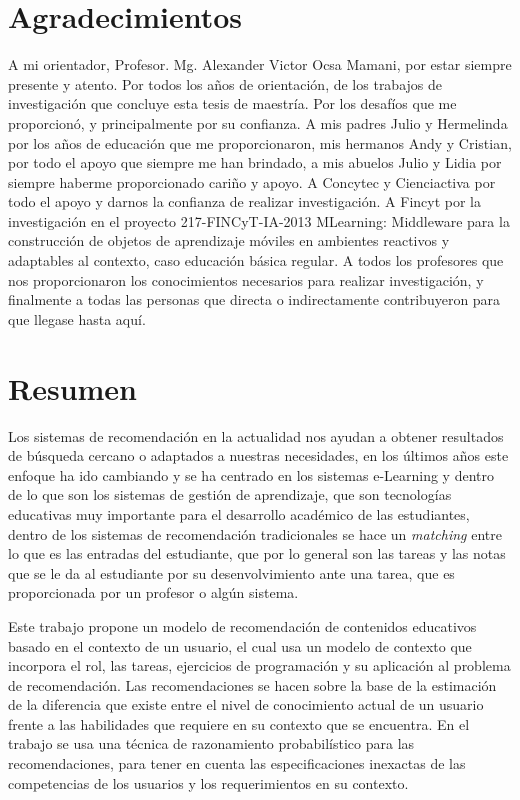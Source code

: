 \chapter*{Agradecimientos}

A mi orientador, Profesor. Mg. Alexander Victor Ocsa Mamani, por estar siempre presente y atento. Por todos los años de orientación, de los trabajos de investigación que concluye esta tesis de maestría. Por los desafíos que me proporcionó, y principalmente por su confianza. A mis padres Julio y Hermelinda por los años de educación que me proporcionaron, mis hermanos Andy y Cristian, por todo el apoyo que siempre me han brindado, a mis abuelos Julio y Lidia por siempre haberme proporcionado cariño y apoyo. A Concytec y Cienciactiva por todo el apoyo y darnos la confianza de realizar investigación. A Fincyt por la investigación en el proyecto 217-FINCyT-IA-2013 MLearning: Middleware para la construcción de objetos de aprendizaje móviles en ambientes reactivos y adaptables al contexto, caso educación básica regular. A todos los profesores que nos proporcionaron los conocimientos necesarios para realizar investigación, y finalmente a todas las personas que directa o indirectamente contribuyeron para que llegase hasta aquí.





\chapter*{Resumen}


Los sistemas de recomendación en la actualidad nos ayudan a obtener resultados  de búsqueda cercano o adaptados a nuestras necesidades, en los últimos años este enfoque ha ido cambiando y se ha centrado en los sistemas e-Learning y dentro de lo que son los sistemas de gestión de aprendizaje, que son tecnologías educativas muy importante para el desarrollo académico de las estudiantes, dentro de los sistemas de recomendación tradicionales se hace un \emph{matching} entre lo que es las entradas del estudiante, que por lo general son las tareas y las notas que se le da al estudiante por su desenvolvimiento ante una tarea, que es proporcionada por un profesor o algún sistema.

Este trabajo propone un modelo de recomendación de contenidos educativos basado en el contexto de un usuario, el cual usa un modelo de contexto que incorpora el rol, las tareas, ejercicios de programación y su aplicación al problema de recomendación. Las recomendaciones se hacen sobre la base de la estimación de la diferencia  que existe entre el nivel de conocimiento actual de un usuario frente a las habilidades que requiere en su contexto que se encuentra. En el trabajo se usa una técnica de razonamiento probabilístico para las recomendaciones, para tener en cuenta las especificaciones inexactas de las competencias de los usuarios y los requerimientos en su contexto.

